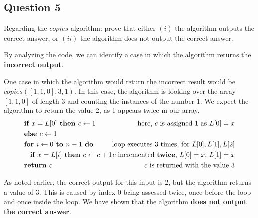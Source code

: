 \documentclass[12pt]{article}
\begin{document}
    \subsection*{Question 5}
        Regarding the $copies$ algorithm: prove that either $(i)$ the algorithm outputs the correct answer, or $(ii)$ the algorithm does not output the correct answer.

        By analyzing the code, we can identify a case in which the algorithm returns the \textbf{incorrect output}.

        One case in which the algorithm would return the incorrect result would be $copies([1,1,0],3,1)$. In this case, the algorithm is looking over the array $[1,1,0]$ of length 3 and counting the instances of the number 1. We expect the algorithm to return the value 2, as 1 appears twice in our array.
        \begin{align*}
            \begin{split}
                &\textbf{if } x=L[0] \textbf{ then } c \leftarrow 1\\
                &\textbf{else } c \leftarrow 1\\
                &\textbf{for $i \leftarrow{} 0$ to $n-1$ do}\\
                &\textbf{\hspace*{3mm}if $x = L[i]$ then $c \leftarrow{} c+1$}\\
                &\textbf{return $c$}
            \end{split}
            \begin{split}
                \text{here, $c$ is assigned 1 as $L[0]=x$}\\
                \text{}\\
                \text{loop executes 3 times, for $L[0], L[1], L[2]$}\\
                \text{$c$ incremented \textbf{twice}, $L[0]=x$, $L[1]=x$}\\
                \text{$c$ is returned with the value 3}
            \end{split}
        \end{align*}

        As noted earlier, the correct output for this input is 2, but the algorithm returns a value of 3. This is caused by index 0 being assessed twice, once before the loop and once inside the loop. We have shown that the algorithm \textbf{does not output the correct answer}.
\end{document}
